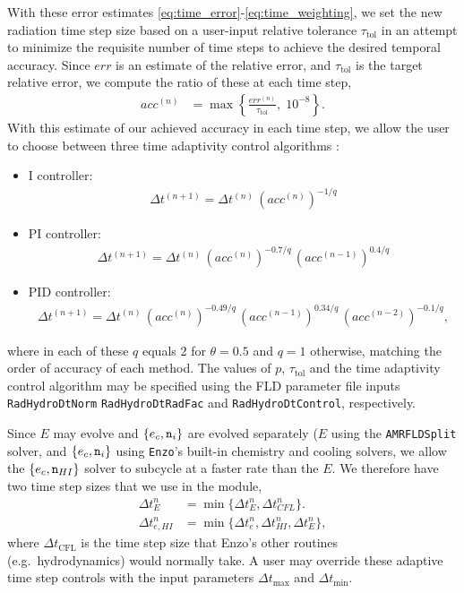\documentclass[letterpaper,10pt]{article}
\renewcommand{\(}{\left(}
\renewcommand{\)}{\right)}
\newcommand{\dt}{\Delta t}
\newcommand{\mn}{{\tt n}}
\begin{document}
With these error estimates
\eqref{eq:time_error}-\eqref{eq:time_weighting}, we set the new
radiation time step size based on a user-input relative tolerance
$\tau_{\text{tol}}$ in an attempt to minimize the requisite number of
time steps to achieve the desired temporal accuracy.  Since $err$ is
an estimate of the relative error, and $\tau_{\text{tol}}$ is the
target relative error, we compute the ratio of these at each time
step,
\begin{align}
  \label{eq:time_weighting}
  acc^{(n)} &= \max\left\{\frac{err^{(n)}}{\tau_{\text{tol}}},\; 10^{-8} \right\}.
\end{align}
With this estimate of our achieved accuracy in each time step, we
allow the user to choose between three time adaptivity control
algorithms \cite{KennedyCarpenter2003}:
\begin{itemize}
\item I controller: 
  \begin{align}
    \label{eq:time_estimateI}
    \dt^{(n+1)} = \dt^{(n)}\, (acc^{(n)})^{-1/q}
  \end{align}
\item PI controller:
  \begin{align}
    \label{eq:time_estimatePI}
    \dt^{(n+1)} = \dt^{(n)}\, (acc^{(n)})^{-0.7/q}\, (acc^{(n-1)})^{0.4/q}
  \end{align}
\item PID controller:
  \begin{align}
    \label{eq:time_estimatePID}
    \dt^{(n+1)} = \dt^{(n)}\, (acc^{(n)})^{-0.49/q}\, (acc^{(n-1)})^{0.34/q}\, (acc^{(n-2)})^{-0.1/q},
  \end{align}
\end{itemize}
where in each of these $q$ equals 2 for $\theta=0.5$ and $q=1$
otherwise, matching the order of accuracy of each method.  The values
of $p$, $\tau_{\text{tol}}$ and the time adaptivity control algorithm may
be specified using the FLD parameter file inputs {\tt RadHydroDtNorm}
{\tt RadHydroDtRadFac} and {\tt RadHydroDtControl}, respectively.






Since $E$ may evolve and $\{e_c,\mn_{i}\}$ are evolved separately ($E$ using the
{\tt AMRFLDSplit} solver, and $\{e_c,\mn_{i}\}$ using {\tt Enzo}'s
built-in chemistry and cooling solvers, 
we allow the $\{e_c,\mn_{HI}\}$ solver to subcycle at a faster rate
than the $E$.  We therefore have two time step sizes that we use in
the module,
\begin{align}
\label{eq:FLD_time_estimate}
  \dt_{E}^{n} &= \min\{\dt_{E}^{n},\dt_{CFL}^{n}\}. \\
  \dt_{e,HI}^{n} &= \min\{\dt_{e}^{n},\dt_{HI}^{n},\dt_{E}^{n}\},
\end{align}
where $\dt_{\text{CFL}}$ is the time step size that Enzo's other
routines (e.g.~hydrodynamics) would normally take.  A user may
override these adaptive time step controls with the input parameters 
$\dt_{\text{max}}$ and $\dt_{\text{min}}$. 
\end{document}
